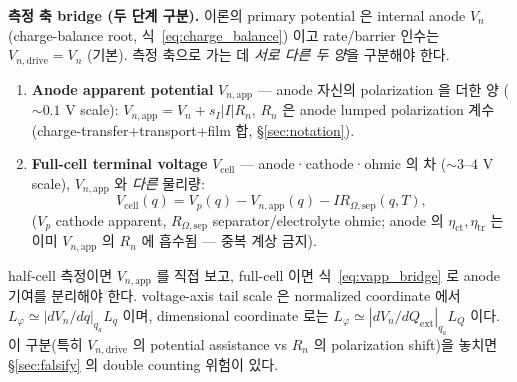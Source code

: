 \documentclass[11pt,a4paper]{article}
\newcommand{\app}{\mathrm{app}}
\newcommand{\dimedrive}{\mathrm{drive}}
\newcommand{\cell}{\mathrm{cell}}
\newcommand{\ext}{\mathrm{ext}}
\begin{document}
\textbf{측정 축 bridge (두 단계 구분).} 이론의 primary potential 은 internal anode
$V_n$ (charge-balance root, 식~\eqref{eq:charge_balance}) 이고 rate/barrier 인수는
$V_{n,\dimedrive}=V_n$ (기본). 측정 축으로 가는 데 \emph{서로 다른 두 양}을 구분해야 한다.
\begin{enumerate}[label=(\roman*)]
\item \textbf{Anode apparent potential} $V_{n,\app}$ — anode 자신의 polarization 을 더한
  양 ($\sim0.1$ V scale): $V_{n,\app}=V_n+s_I|I|R_n$, $R_n$ 은 anode lumped polarization
  계수 (charge-transfer+transport+film 합, \S\ref{sec:notation}).
\item \textbf{Full-cell terminal voltage} $V_{\cell}$ — anode·cathode·ohmic 의 차
  ($\sim3$--$4$ V scale), $V_{n,\app}$ 와 \emph{다른} 물리량:
  \begin{equation}
  V_{\cell}(q)=V_p(q)-V_{n,\app}(q)-I R_{\Omega,\mathrm{sep}}(q,T),
  \label{eq:vapp_bridge}
  \end{equation}
  ($V_p$ cathode apparent, $R_{\Omega,\mathrm{sep}}$ separator/electrolyte ohmic; anode
  의 $\eta_{\mathrm{ct}},\eta_{\mathrm{tr}}$ 는 이미 $V_{n,\app}$ 의 $R_n$ 에 흡수됨 —
  중복 계상 금지).
\end{enumerate}
half-cell 측정이면 $V_{n,\app}$ 를 직접 보고, full-cell 이면 식~\eqref{eq:vapp_bridge} 로
anode 기여를 분리해야 한다. voltage-axis tail scale 은 normalized coordinate 에서
$L_\varphi\simeq|dV_n/dq|_{q_a}L_q$ 이며, dimensional coordinate 로는
$L_\varphi\simeq|dV_n/dQ_\ext|_{q_a}L_Q$ 이다.
이 구분(특히 $V_{n,\dimedrive}$ 의 potential assistance vs $R_n$ 의 polarization shift)을
놓치면 \S\ref{sec:falsify} 의 double counting 위험이 있다.

\end{document}
